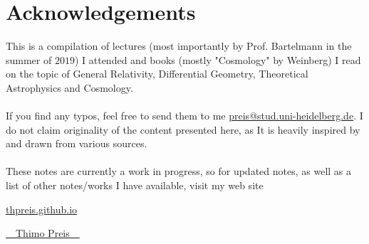 
\newpage
\section*{Acknowledgements}

This is a compilation of lectures (most importantly by Prof. Bartelmann in the summer of $2019$) I attended and books (mostly "Cosmology" by Weinberg) I read on the topic of General Relativity, Differential Geometry, Theoretical Astrophysics and Cosmology.\\
\\
If you find any typos, feel free to send them to me \href{mailto:preis@stud.uni-heidelberg.de}{preis@stud.uni-heidelberg.de}. I do not claim originality of the content presented here, as It is heavily inspired by and drawn from various sources.
\\
\\
These notes are currently a work in progress, so for updated notes, as well as a list of other notes/works I have available, visit my web site

\begin{center}
    \href{thpreis.github.io}{thpreis.github.io}
\end{center}
\vspace{1cm}

\begin{flushright}
    \Huge{{\cursive\setul{0.1ex}{}\ul{~~Thimo Preis~~}}}
\end{flushright}
